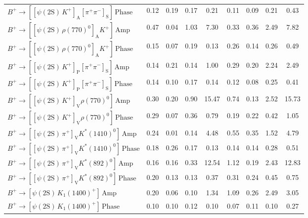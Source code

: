 \begin{tabular}{l  c  c  c  c  c  c  c  | c }
$B^{+}\rightarrow \left[\left[\psi(\text{2S})\,K^{+}\right]_{\text{A}}\left[\pi^{+}\pi^{-}\right]_{\text{S}}\right]\,\text{Phase}$ & 0.12 & 0.19 & 0.17 & 0.21 & 0.11 & 0.09 & 0.21 & 0.43 \\ 
$B^{+}\rightarrow \left[\left[\psi(\text{2S})\,\rho(770)^{0}\right]_{\text{A}}K^{+}\right]\,\text{Amp}$ & 0.47 & 0.04 & 1.03 & 7.30 & 0.33 & 0.36 & 2.49 & 7.82 \\ 
$B^{+}\rightarrow \left[\left[\psi(\text{2S})\,\rho(770)^{0}\right]_{\text{A}}K^{+}\right]\,\text{Phase}$ & 0.15 & 0.07 & 0.19 & 0.13 & 0.26 & 0.14 & 0.26 & 0.49 \\ 
$B^{+}\rightarrow \left[\left[\psi(\text{2S})\,K^{+}\right]_{\text{P}}\left[\pi^{+}\pi^{-}\right]_{\text{S}}\right]\,\text{Amp}$ & 0.14 & 0.21 & 0.14 & 1.00 & 0.29 & 0.20 & 2.24 & 2.49 \\ 
$B^{+}\rightarrow \left[\left[\psi(\text{2S})\,K^{+}\right]_{\text{P}}\left[\pi^{+}\pi^{-}\right]_{\text{S}}\right]\,\text{Phase}$ & 0.14 & 0.10 & 0.17 & 0.14 & 0.12 & 0.08 & 0.25 & 0.41 \\ 
$B^{+}\rightarrow \left[\left[\psi(\text{2S})\,K^{+}\right]_{\text{V}}\rho(770)^{0}\right]\,\text{Amp}$ & 0.30 & 0.20 & 0.90 & 15.47 & 0.74 & 0.13 & 2.52 & 15.73 \\ 
$B^{+}\rightarrow \left[\left[\psi(\text{2S})\,K^{+}\right]_{\text{V}}\rho(770)^{0}\right]\,\text{Phase}$ & 0.29 & 0.07 & 0.36 & 0.79 & 0.19 & 0.22 & 0.42 & 1.05 \\ 
$B^{+}\rightarrow \left[\left[\psi(\text{2S})\,\pi^{+}\right]_{\text{V}}K^{*}(1410)^{0}\right]\,\text{Amp}$ & 0.24 & 0.01 & 0.14 & 4.48 & 0.55 & 0.35 & 1.52 & 4.79 \\ 
$B^{+}\rightarrow \left[\left[\psi(\text{2S})\,\pi^{+}\right]_{\text{V}}K^{*}(1410)^{0}\right]\,\text{Phase}$ & 0.18 & 0.26 & 0.17 & 0.13 & 0.14 & 0.14 & 0.28 & 0.51 \\ 
$B^{+}\rightarrow \left[\left[\psi(\text{2S})\,\pi^{+}\right]_{\text{V}}K^{*}(892)^{0}\right]\,\text{Amp}$ & 0.16 & 0.16 & 0.33 & 12.54 & 1.12 & 0.19 & 2.43 & 12.83 \\ 
$B^{+}\rightarrow \left[\left[\psi(\text{2S})\,\pi^{+}\right]_{\text{V}}K^{*}(892)^{0}\right]\,\text{Phase}$ & 0.20 & 0.13 & 0.13 & 0.37 & 0.31 & 0.24 & 0.45 & 0.75 \\ 
$B^{+}\rightarrow \left[\psi(\text{2S})\,K_{1}(1400)^{+}\right]\,\text{Amp}$ & 0.20 & 0.06 & 0.10 & 1.34 & 1.09 & 0.26 & 2.49 & 3.05 \\ 
$B^{+}\rightarrow \left[\psi(\text{2S})\,K_{1}(1400)^{+}\right]\,\text{Phase}$ & 0.10 & 0.10 & 0.12 & 0.10 & 0.07 & 0.11 & 0.10 & 0.27 \\ 

\end{tabular}
